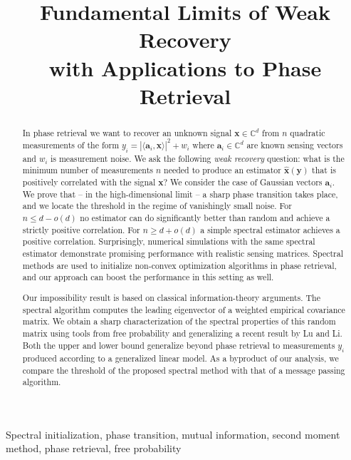 \documentclass[final,12pt]{colt2018}
\title[Fundamental Limits of Weak Recovery with Applications to Phase Retrieval]{Fundamental Limits of Weak Recovery\\ with Applications to Phase Retrieval}
\def\complex{{\mathbb C}}
\def\<{\langle}
\def\>{\rangle}
\def\ba{{\boldsymbol a}}
\def\bx{{\boldsymbol x}}
\def\by{{\boldsymbol y}}
\def\complex{{\mathbb C}}
\begin{document}
\maketitle

\begin{abstract}
In phase retrieval we want to recover an unknown signal $\bx\in\complex^d$ from $n$ quadratic measurements of the form 
$y_i = |\<\ba_i,\bx\>|^2+w_i$ where $\ba_i\in \complex^d$ are known sensing vectors and  $w_i$ is measurement noise. We ask the following
\emph{weak recovery} question: what is the minimum number of measurements $n$ needed to produce an estimator $\hat{\bx}(\by)$ that is positively correlated with 
the signal $\bx$?
We consider the case of Gaussian  vectors $\ba_i$. We prove that -- in the high-dimensional limit -- a sharp phase transition takes place, and we locate the threshold in the regime of vanishingly small noise.
For $n\le d-o(d)$ no estimator can do significantly better than random and achieve a strictly positive correlation.
For $n\ge d+o(d)$ a simple spectral estimator achieves a positive correlation. 
Surprisingly, numerical simulations with the same spectral estimator  demonstrate promising performance with realistic sensing matrices. 
Spectral methods are used to initialize non-convex optimization algorithms in phase retrieval, and our approach can boost the performance in this setting as well.

Our impossibility result is based on classical information-theory arguments. The spectral algorithm computes the leading eigenvector
of a weighted empirical covariance matrix. We obtain a sharp
characterization of the spectral properties of this random matrix  using tools from free probability and generalizing
a recent result by Lu and Li. 
Both the upper and lower bound generalize beyond phase retrieval to measurements $y_i$ produced according to a generalized linear model. 
As a byproduct of our analysis, we compare the threshold of the proposed spectral method with that of a message passing algorithm. 
\end{abstract}

\begin{keywords}
Spectral initialization, phase transition, mutual information, second moment method, phase retrieval, free probability
\end{keywords}

\end{document}

